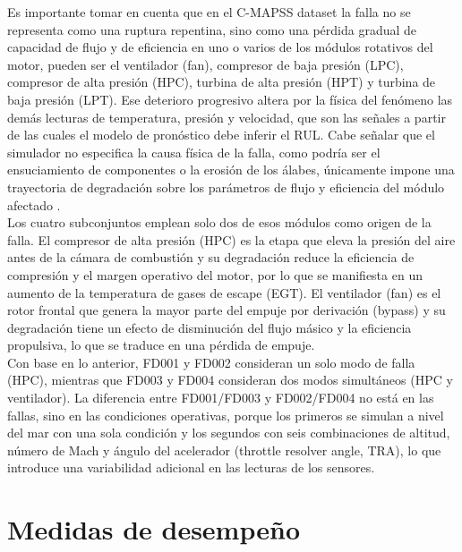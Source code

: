 Es importante tomar en cuenta que en el C-MAPSS dataset la falla no se representa como una ruptura repentina, sino como una pérdida gradual de capacidad de flujo y de eficiencia en uno o varios de los módulos rotativos del motor, pueden ser el ventilador (fan), compresor de baja presión (LPC), compresor de alta presión (HPC), turbina de alta presión (HPT) y turbina de baja presión (LPT). Ese deterioro progresivo altera por la física del fenómeno las demás lecturas de temperatura, presión y velocidad, que son las señales a partir de las cuales el modelo de pronóstico debe inferir el RUL. Cabe señalar que el simulador no especifica la causa física de la falla, como podría ser el ensuciamiento de componentes o la erosión de los álabes, únicamente impone una trayectoria de degradación sobre los parámetros de flujo y eficiencia del módulo afectado \cite{saxena2008}.\\[.15cm]

Los cuatro subconjuntos emplean solo dos de esos módulos como origen de la falla. El compresor de alta presión (HPC) es la etapa que eleva la presión del aire antes de la cámara de combustión y su degradación reduce la eficiencia de compresión y el margen operativo del motor, por lo que se manifiesta en un aumento de la temperatura de gases de escape (EGT). El ventilador (fan) es el rotor frontal que genera la mayor parte del empuje por derivación (bypass) y su degradación tiene un efecto de disminución del flujo másico y la eficiencia propulsiva, lo que se traduce en una pérdida de empuje.\\[.15cm]

Con base en lo anterior, FD001 y FD002 consideran un solo modo de falla (HPC), mientras que FD003 y FD004 consideran dos modos simultáneos (HPC y ventilador). La diferencia entre FD001/FD003 y FD002/FD004 no está en las fallas, sino en las condiciones operativas, porque los primeros se simulan a nivel del mar con una sola condición y los segundos con seis combinaciones de altitud, número de Mach y ángulo del acelerador (throttle resolver angle, TRA), lo que introduce una variabilidad adicional en las lecturas de los sensores.

\section{Medidas de desempeño}

